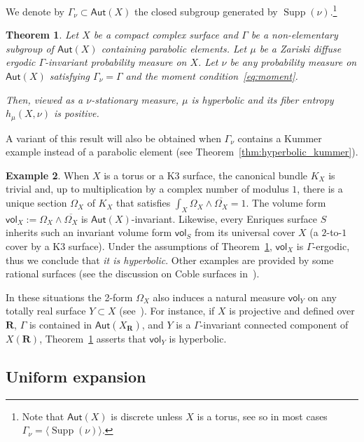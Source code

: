 \documentclass[11pt]{article}
\DeclareMathOperator{\supp}{Supp}
\def\R{\mathbf{R}}
\newcommand\Aut{\mathsf{Aut}}
\newcommand{\vol}{{\mathsf{vol}}}
\theoremstyle{plain}
\newtheorem{thm}{Theorem}[section]
\theoremstyle{definition}
\newtheorem{example}[thm]{Example}
\numberwithin{equation}{section}
\begin{document}
We denote by $\Gamma_\nu \subset \Aut(X)$
the closed subgroup generated by $\supp(\nu)$.\footnote{\label{page:discrete}Note that $\Aut(X)$ is discrete unless
$X$ is a torus, see \cite[\S 3]{stiffness}
so in most cases $\Gamma_\nu = \langle \supp(\nu) \rangle$.}

\begin{thm}\label{thm:hyperbolic}
Let $X$ be a compact complex surface and
$\Gamma$ be a non-elementary subgroup of $\Aut(X)$ containing parabolic elements.
Let $\mu$ be a Zariski diffuse ergodic $\Gamma$-invariant probability measure on $X$.
Let $\nu$ be any probability measure on $\Aut(X)$
satisfying $\Gamma_\nu=\Gamma$ and the moment condition~\eqref{eq:moment}.

Then, viewed as a $\nu$-stationary measure, $\mu$ is hyperbolic and its fiber entropy $h_\mu(X,\nu)$ is positive.
\end{thm}

A variant of this result will also be obtained when $\Gamma_\nu$ contains a Kummer example
instead of a parabolic element (see Theorem~\ref{thm:hyperbolic_kummer}).

\begin{example}\label{eg:K3_intro} When $X$ is a torus or a K3 surface, the canonical bundle $K_X$ is trivial and, up to multiplication by a complex number of modulus $1$, there is
a unique section $\Omega_X$ of $K_X$ that satisfies $\int_X\Omega_X\wedge \overline{\Omega_X}=1$. The volume form $\vol_X:=\Omega_X\wedge \overline{\Omega_X}$
is $\Aut(X)$-invariant. Likewise, every Enriques surface $S$ inherits such an invariant volume form $\vol_S$ from its universal cover $X$ (a $2$-to-$1$ cover by a K3 surface).
Under the assumptions of Theorem~\ref{thm:hyperbolic}, $\vol_X$ is $\Gamma$-ergodic,
thus we conclude that {\textit{it is hyperbolic}}. Other examples are provided by some rational surfaces (see the discussion on Coble surfaces in~\cite{Simons}).

In these situations the 2-form $\Omega_X$ also induces a natural measure $\vol_Y$ on any totally real surface $Y\subset X$ (see~\cite[Rem.\,2.3]{invariant}). For instance, if $X$ is projective and defined over $\R$, $\Gamma$ is contained in $\Aut(X_\R)$, and $Y$ is a $\Gamma$-invariant connected component of $X(\R)$, Theorem~\ref{thm:hyperbolic} asserts that $\vol_Y$ is hyperbolic.
\end{example}

\subsection{Uniform expansion}\label{subs:UE_intro}
\end{document}
